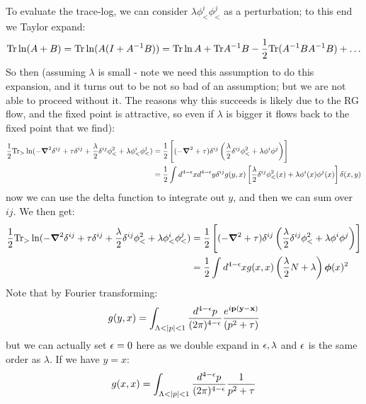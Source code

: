 To evaluate the trace-log, we can consider $\lambda \phi^i_< \phi^j_<$ as a perturbation; to this end we Taylor expand:
\begin{equation}
    \mathrm{Tr}\ln(A + B) = \mathrm{Tr}\ln(A(I + A^{-1}B)) = \mathrm{Tr}\ln A + \mathrm{Tr} A^{-1}B - \frac{1}{2}\mathrm{Tr}(A^{-1}BA^{-1}B) + \ldots
\end{equation}
So then (assuming $\lambda$ is small - note we need this assumption to do this expansion, and it turns out to be not so bad of an assumption; but we are not able to proceed without it. The reasons why this succeeds is likely due to the RG flow, and the fixed point is attractive, so even if $\lambda$ is bigger it flows back to the fixed point that we find):
\begin{equation}
    \begin{split}
        \frac{1}{2}\Tr_>\ln(-\nabla^2\delta^{ij} + \tau\delta^{ij} + \frac{\lambda}{2}\delta^{ij}\phi_<^2 + \lambda \phi_<^i\phi_<^j ) &= \frac{1}{2}\left[(-\nabla^2 + \tau)\delta^{ij}\left(\frac{\lambda}{2}\delta^{ij}\phi_<^2 + \lambda \phi^i \phi^j\right)\right]
        \\ &= \frac{1}{2}\int d^{4-\e}x d^{4-\e}y \delta^{ij}g(y, x)\left[\frac{\lambda}{2}\delta^{ij}\phi_<^2(x) + \lambda\phi^i(x)\phi^j(x)\right]\delta(x, y)
    \end{split}
\end{equation}
now we can use the delta function to integrate out $y$, and then we can sum over $ij$. We then get:
\begin{equation}
    \begin{split}
        \frac{1}{2}\Tr_>\ln(-\nabla^2\delta^{ij} + \tau\delta^{ij} + \frac{\lambda}{2}\delta^{ij}\phi_<^2 + \lambda \phi_<^i\phi_<^j ) &= \frac{1}{2}\left[(-\nabla^2 + \tau)\delta^{ij}\left(\frac{\lambda}{2}\delta^{ij}\phi_<^2 + \lambda \phi^i \phi^j\right)\right]
        \\ &= \frac{1}{2}\int d^{4-\e}x g(x, x)\left(\frac{\lambda}{2}N + \lambda\right)\gv{\phi}(x)^2
    \end{split}
\end{equation}
Note that by Fourier transforming:
\begin{equation}
    g(y, x) = \int_{\Lambda < \lvert p \rvert < 1} \frac{d^{4-\epsilon}p}{(2\pi)^{4-\epsilon}}\frac{e^{i\mathbf{p}(\mathbf{y} - \mathbf{x})}}{(p^2 + \tau)}
\end{equation}
but we can actually set $\epsilon = 0$ here as we double expand in $\epsilon, \lambda$ and $\epsilon$ is the same order as $\lambda$. If we have $y = x$:
\begin{equation}
    g(x, x) = \int_{\Lambda < \lvert p \rvert < 1} \frac{d^{4-\epsilon}p}{(2\pi)^{4-\epsilon}}\frac{1}{p^2 + \tau}
\end{equation}
